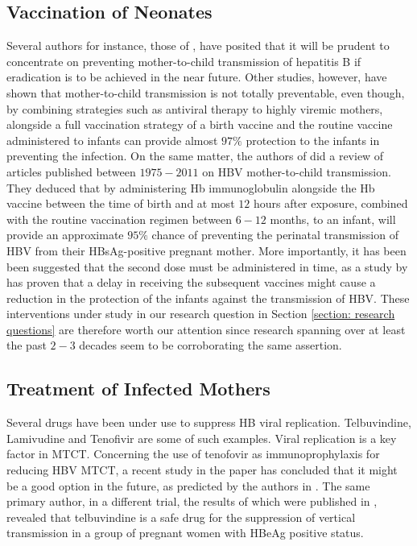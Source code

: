 \subsection{Vaccination of Neonates}
Several authors for instance, those of \cite{tran2009management,andersson2015mother, xu2013nextstep,shimakawa2016mother}, have posited that it will be prudent to concentrate on preventing mother-to-child transmission of hepatitis B if eradication is to be achieved in the near future. Other studies, however, have shown that mother-to-child transmission is not totally preventable, even though, by combining strategies such as antiviral therapy to highly viremic mothers, alongside a full vaccination strategy of a birth vaccine and the routine vaccine administered to infants can provide almost $97\%$ protection to the infants\cite{tran2009management} in preventing the infection. On the same matter, the authors of \cite{Pan2012} did a review of articles published between $1975-2011$ on HBV mother-to-child transmission. They deduced that by administering Hb immunoglobulin alongside the Hb vaccine between the time of birth and at most $12$ hours after exposure, combined with the routine vaccination regimen between $6-12$ months, to an infant, will provide an approximate $95\%$ chance of preventing the perinatal transmission of HBV from their HBsAg-positive pregnant mother. More importantly, it has been been suggested that the second dose must be administered in time, as a study by \cite{tharmaphornpilas2009increasedRisk} has proven that a delay in receiving the subsequent vaccines might cause a reduction in the protection of the infants against the transmission of HBV. 
These interventions under study in our research question in Section \ref{section: research questions} are therefore worth our attention since research spanning over at least the past $2-3$ decades seem to be corroborating the same assertion. 

\subsection{Treatment of Infected Mothers}
Several drugs have been under use to suppress HB viral replication. Telbuvindine, Lamivudine and Tenofivir are some of such examples. Viral replication is a key factor in MTCT. Concerning the use of tenofovir as immunoprophylaxis for reducing HBV MTCT, a recent study in the paper \cite{pan2016TenofivirToPrevent} has concluded that it might be a good option in the future, as predicted by the authors in \cite{xu2013nextstep}. The same primary author, in a different trial, the results of which were published in \cite{pan2012telbivudine}, revealed that telbuvindine is a safe drug for the suppression of vertical transmission in a group of pregnant women with HBeAg positive status.



